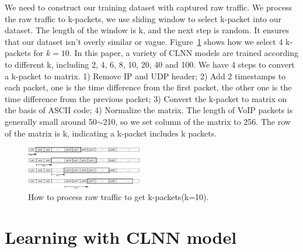 \documentclass[conference]{IEEEtran}
\begin{document}
We need to construct our training dataset with captured raw traffic. We process the raw traffic to k-packets, we use sliding window to select k-packet into our dataset. The length of the window is k, and the next step is random. It ensures that our dataset isn't overly similar or vague. Figure~\ref{fig:dataset} shows how we select 4 k-packets for $k=10$. In this paper, a variety of CLNN models are trained according to different k, including 2, 4, 6, 8, 10, 20, 40 and 100. We have 4 steps to convert a k-packet to matrix. 1) Remove IP and UDP header; 2) Add 2 timestamps to each packet, one is the time difference from the first packet, the other one is the time difference from the previous packet; 3) Convert the k-packet to matrix on the basis of ASCII code; 4) Normalize the matrix. The length of VoIP packets is generally small around 50$\sim$210, so we set column of the matrix to 256. The row of the matrix is k, indicating a k-packet includes k packets.

\begin{figure}[htp]
\begin{center}
\includegraphics[width=0.45\textwidth]{dataset.eps}
\caption{How to process raw traffic to get k-packets(k=10).}\label{fig:dataset}
\end{center}
\end{figure}

\section{Learning with CLNN model}
\label{sec:learningusingdeeplearningmodel}
\end{document}
